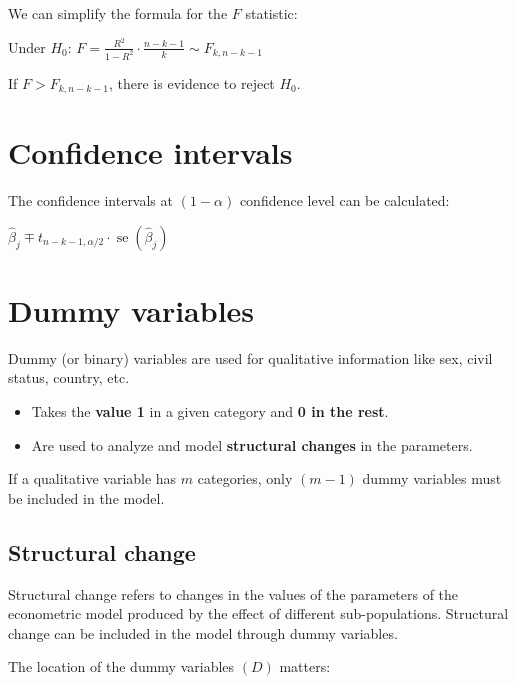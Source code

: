 \documentclass[10pt, a4paper, landscape]{article}
\DeclareMathOperator{\se}{se}
\begin{document}
\begin{multicols}{3}
We can simplify the formula for the \( F \) statistic:

\begin{center}
	Under \( H_{0} \): \quad \( F = \frac{R^{2}}{1 - R^{2}} \cdot \frac{n - k - 1}{k} \sim F_{k, n - k - 1} \)
\end{center}

If \( F > F_{k, n - k - 1} \), there is evidence to reject \( H_{0} \).

\section*{Confidence intervals}

The confidence intervals at \( (1 - \alpha) \) confidence level can be calculated:

\begin{center}
	\( \hat{\beta}_{j} \mp t_{n - k - 1, \alpha / 2} \cdot \se(\hat{\beta}_{j}) \)
\end{center}

\columnbreak

\section*{Dummy variables}

Dummy (or binary) variables are used for qualitative information like sex, civil status, country, etc.

\begin{itemize}[leftmargin=*]
	\item Takes the \textbf{value 1} in a given category and \textbf{0 in the rest}.
	\item Are used to analyze and model \textbf{structural changes} in the parameters.
\end{itemize}

If a qualitative variable has \( m \) categories, only \( (m - 1) \) dummy variables must be included in the model.

\subsection*{Structural change}

Structural change refers to changes in the values of the parameters of the econometric model produced by the effect of different sub-populations. Structural change can be included in the model through dummy variables.

The location of the dummy variables \( (D) \) matters:


\end{multicols}
\end{document}
